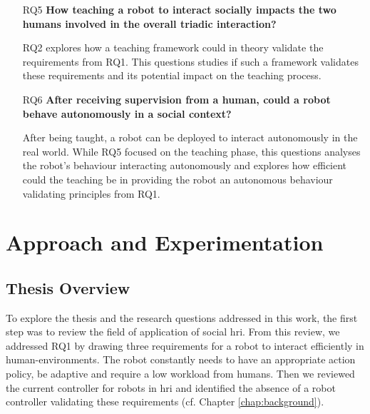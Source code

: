 \begin{itemize}
	\item [RQ5] \textbf{How teaching a robot to interact socially impacts the two humans involved in the overall triadic interaction?}
	
		RQ2 explores how a teaching framework could in theory validate the requirements from RQ1. This questions studies if such a framework validates these requirements and its potential impact on the teaching process.
		
    \item [RQ6] \textbf{After receiving supervision from a human, could a robot behave autonomously in a social context?}

	 	After being taught, a robot can be deployed to interact autonomously in the real world. While RQ5 focused on the teaching phase, this questions analyses the robot's behaviour interacting autonomously and explores how efficient could the teaching be in providing the robot an autonomous behaviour validating principles from RQ1.
	 
\end{itemize}

\section{Approach and Experimentation}
\subsection{Thesis Overview} 

To explore the thesis and the research questions addressed in this work, the first step was to review the field of application of social \gls{hri}. From this review, we addressed RQ1 by drawing three requirements for a robot to interact efficiently in human-environments. The robot constantly needs to have an appropriate action policy, be adaptive and require a low workload from humans. Then we reviewed the current controller for robots in \gls{hri} and identified the absence of a robot controller validating these requirements (cf. Chapter \ref{chap:background}).

